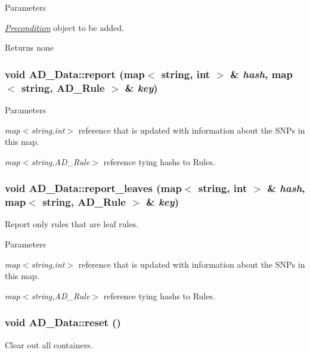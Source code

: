 \begin{DoxyParams}{Parameters}
\item[{\em \hyperlink{classPrecondition}{Precondition}}]object to be added. \end{DoxyParams}
\begin{DoxyReturn}{Returns}
none 
\end{DoxyReturn}
\hypertarget{classAD__Data_a3f3b8cda87456d54814498a9c636ee4c}{
\subsubsection[{report}]{\setlength{\rightskip}{0pt plus 5cm}void AD\_\-Data::report (map$<$ string, int $>$ \& {\em hash}, \/  map$<$ string, {\bf AD\_\-Rule} $>$ \& {\em key})}}
\label{classAD__Data_a3f3b8cda87456d54814498a9c636ee4c}

\begin{DoxyParams}{Parameters}
\item[{\em map$<$string,int$>$}]reference that is updated with information about the SNPs in this map. \item[{\em map$<$string,AD\_\-Rule$>$}]reference tying hashs to Rules. \end{DoxyParams}
\hypertarget{classAD__Data_a94ff3af2d77f31a1b872d9bf621a05cd}{
\subsubsection[{report\_\-leaves}]{\setlength{\rightskip}{0pt plus 5cm}void AD\_\-Data::report\_\-leaves (map$<$ string, int $>$ \& {\em hash}, \/  map$<$ string, {\bf AD\_\-Rule} $>$ \& {\em key})}}
\label{classAD__Data_a94ff3af2d77f31a1b872d9bf621a05cd}
Report only rules that are leaf rules.


\begin{DoxyParams}{Parameters}
\item[{\em map$<$string,int$>$}]reference that is updated with information about the SNPs in this map. \item[{\em map$<$string,AD\_\-Rule$>$}]reference tying hashs to Rules. \end{DoxyParams}
\hypertarget{classAD__Data_a0297c2b6c70f703bed9055ec8536292c}{
\subsubsection[{reset}]{\setlength{\rightskip}{0pt plus 5cm}void AD\_\-Data::reset ()}}
\label{classAD__Data_a0297c2b6c70f703bed9055ec8536292c}
Clear out all containers.


